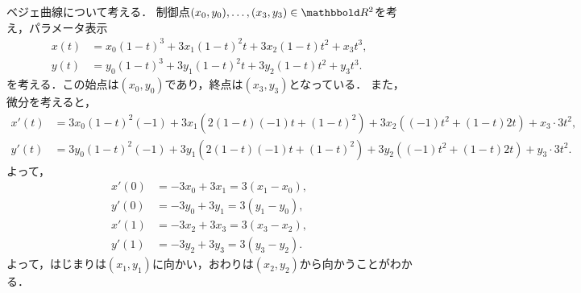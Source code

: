 \documentclass[9pt]{ltjsarticle}
\begin{document}
ベジェ曲線について考える．
制御点$(x_0,y_0),\dots,(x_3,y_3) \in \R^2$を考え，パラメータ表示
\begin{align}
 x(t) &= x_0(1-t)^3 + 3x_1 (1-t)^2 t + 3x_2 (1-t)t^2 + x_3 t^3,\\
 y(t)& = y_0(1-t)^3 + 3y_1 (1-t)^2 t + 3y_2 (1-t)t^2 + y_3 t^3.
\end{align}
を考える．この始点は$(x_0,y_0)$であり，終点は$(x_3,y_3)$となっている．
また，微分を考えると，
\begin{align}
 x'(t) &= 3x_0 (1-t)^2 (-1) + 3x_1 (2(1-t)(-1)t + (1-t)^2) + 3x_2((-1)t^2 + (1-t)2t) + x_3\cdot 3t^2,\\
 y'(t)& =
3y_0(1-t)^2(-1) + 3y_1(2(1-t)(-1)t + (1-t)^2) + 3y_2((-1)t^2 + (1-t)2t) + y_3\cdot 3t^2.
\end{align}
よって，
\begin{align}
 x'(0) &= -3x_0 + 3x_1 = 3(x_1-x_0),\\
 y'(0)& = -3y_0 + 3y_1 = 3(y_1-y_0),\\
 x'(1) & = -3x_2 + 3x_3 = 3(x_3-x_2),\\
 y'(1)& = -3y_2 + 3y_3 = 3(y_3-y_2).
\end{align}
よって，はじまりは$(x_1,y_1)$に向かい，おわりは$(x_2,y_2)$から向かうことがわかる．
\end{document}
